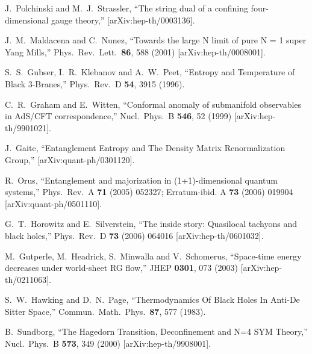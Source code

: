 \documentclass[12pt]{article}
\begin{document}
\begin{thebibliography}{99}
J.~Polchinski and M.~J.~Strassler,
  ``The string dual of a confining four-dimensional gauge theory,''
  [arXiv:hep-th/0003136].


  J.~M.~Maldacena and C.~Nunez,
  ``Towards the large N limit of pure N = 1 super Yang Mills,''
  Phys.\ Rev.\ Lett.\  {\bf 86}, 588 (2001)
  [arXiv:hep-th/0008001].


S.~S.~Gubser, I.~R.~Klebanov and A.~W.~Peet,
``Entropy and
Temperature of Black 3-Branes,''
 Phys.\ Rev.\ D {\bf 54}, 3915 (1996).





C.~R.~Graham and E.~Witten,
  ``Conformal anomaly of submanifold observables in AdS/CFT correspondence,''
  Nucl.\ Phys.\ B {\bf 546}, 52 (1999)
  [arXiv:hep-th/9901021].


 J.\ Gaite,
``Entanglement Entropy and The Density Matrix Renormalization Group,''
[arXiv:quant-ph/0301120].

R.\ Orus,
``Entanglement and majorization in (1+1)-dimensional quantum systems,''
Phys.\ Rev.\ A \textbf{71} (2005) 052327; Erratum-ibid. A \textbf{73} (2006) 019904
[arXiv:quant-ph/0501110].




  G.~T.~Horowitz and E.~Silverstein,
  ``The inside story: Quasilocal tachyons and black holes,''
  Phys.\ Rev.\  D {\bf 73} (2006) 064016
  [arXiv:hep-th/0601032].

  M.~Gutperle, M.~Headrick, S.~Minwalla and V.~Schomerus,
  ``Space-time energy decreases under world-sheet RG flow,''
  JHEP {\bf 0301}, 073 (2003)
  [arXiv:hep-th/0211063].





  S.~W.~Hawking and D.~N.~Page,
  ``Thermodynamics Of Black Holes In Anti-De Sitter Space,''
  Commun.\ Math.\ Phys.\  {\bf 87}, 577 (1983).




  B.~Sundborg,
  ``The Hagedorn Transition, Deconfinement and N=4 SYM Theory,''
  Nucl.\ Phys.\  B {\bf 573}, 349 (2000)
  [arXiv:hep-th/9908001].


\end{thebibliography}
\end{document}
